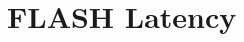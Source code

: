 \hypertarget{group___f_l_a_s_h___latency}{}\section{F\+L\+A\+SH Latency}
\label{group___f_l_a_s_h___latency}
